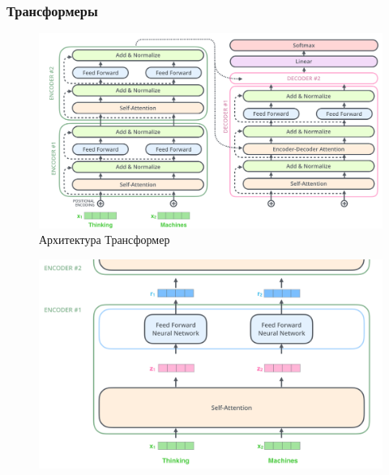 \documentclass[notheorems, handout]{beamer}
\begin{document}
	\begin{frame}
	\frametitle{Трансформеры}
		\begin{figure}[H]
			\begin{center}
				\includegraphics[scale=0.12]{img/transf.png}
				\caption{Архитектура Трансформер}
			\end{center}
		\end{figure}
		\begin{figure}[H]
			\begin{center}
				\includegraphics[scale=0.1]{img/transf2.png}
			\end{center}
		\end{figure}
	\end{frame}
	
\end{document}
